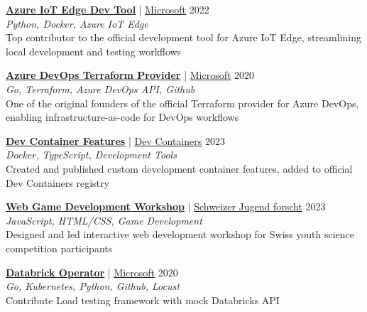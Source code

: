 \documentclass[margin, 10pt, hidelinks]{res} %
\newcommand{\tab}{\hspace*{1em}} %
\newcommand{\emphasize}{\bf} %
\begin{document}
\begin{resume}
    \href{https://github.com/Azure/iotedgedev/pulls?q=is\%3Apr\%20author\%3AEliiseS\%20is\%3Aclosed}{\emphasize\underline{Azure IoT Edge Dev Tool}} | \href{https://www.microsoft.com/}{\underline{Microsoft}} \hfill 2022 \\
    {\it Python, Docker, Azure IoT Edge} \\
    \tab Top contributor to the official development tool for Azure IoT Edge, streamlining local development and testing workflows

    \href{https://github.com/microsoft/terraform-provider-azuredevops}{\emphasize\underline{Azure DevOps Terraform Provider}} | \href{https://www.microsoft.com/}{\underline{Microsoft}} \hfill 2020 \\
    {\it Go, Terraform, Azure DevOps API, Github} \\
    \tab One of the original founders of the official Terraform provider for Azure DevOps, enabling infrastructure-as-code for DevOps workflows

    \href{https://github.com/devcontainers/devcontainers.github.io}{\emphasize\underline{Dev Container Features}} | \href{https://containers.dev/}{\underline{Dev Containers}} \hfill 2023 \\
    {\it Docker, TypeScript, Development Tools} \\
    \tab Created and published custom development container features, added to official Dev Containers registry

    \href{https://github.com/MS-SJF-Projects/web-game-complete}{\emphasize\underline{Web Game Development Workshop}} | \href{https://sjf.ch/}{\underline{Schweizer Jugend forscht}} \hfill 2023 \\
    {\it JavaScript, HTML/CSS, Game Development} \\
    \tab Designed and led interactive web development workshop for Swiss youth science competition participants

    \href{https://github.com/microsoft/azure-databricks-operator/pull/173}{\emphasize\underline{Databrick Operator}} | \href{https://www.microsoft.com/}{\underline{Microsoft}} \hfill 2020 \\
    {\it Go, Kubernetes, Python, Github, Locust} \\
    \tab Contribute Load testing framework with mock Databricks API



\end{resume}
\end{document}
